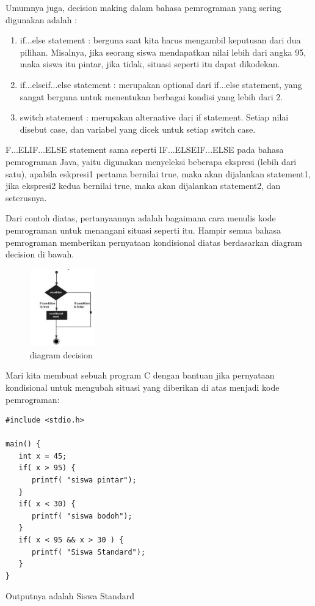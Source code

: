 Umumnya juga, decision making dalam bahasa pemrograman yang sering digunakan adalah :
\begin{enumerate}
\item
if...else statement : berguna saat kita harus mengambil keputusan dari dua pilihan. Misalnya, jika seorang siswa mendapatkan nilai lebih dari angka 95, maka siswa itu pintar, jika tidak, situasi seperti itu dapat dikodekan. 
\item
if...elseif...else statement : merupakan optional dari if...else statement, yang sangat berguna untuk menentukan berbagai kondisi yang lebih dari 2. 
\item
switch statement : merupakan alternative dari if statement. Setiap nilai disebut case, dan variabel yang dicek untuk setiap switch case. 
\end{enumerate}

F...ELIF...ELSE statement sama seperti IF...ELSEIF...ELSE pada bahasa pemrograman Java, yaitu digunakan menyeleksi beberapa ekspresi (lebih dari satu), apabila eskpresi1 pertama bernilai true, maka akan dijalankan statement1, jika ekspresi2 kedua bernilai true, maka akan dijalankan statement2, dan seterusnya.

Dari contoh diatas, pertanyaannya adalah bagaimana cara menulis kode pemrograman untuk menangani situasi seperti itu. Hampir semua bahasa pemrograman memberikan pernyataan kondisional diatas berdasarkan diagram decision di bawah. 
\begin{figure}[ht]
	    \centerline{\includegraphics[width=0.25\textwidth]{figures/diagram_decision}}
	    \caption{diagram decision}
	    \label{diagramdecisionmaking}
	    \end{figure} 

Mari kita membuat sebuah program C dengan bantuan jika pernyataan kondisional untuk mengubah situasi yang diberikan di atas menjadi kode pemrograman:  
\begin{verbatim}
#include <stdio.h>
 
main() {
   int x = 45;
   if( x > 95) {
      printf( "siswa pintar");
   }
   if( x < 30) {
      printf( "siswa bodoh");
   }
   if( x < 95 && x > 30 ) {
      printf( "Siswa Standard");
   }
}
\end{verbatim}
Outputnya adalah Siswa Standard

